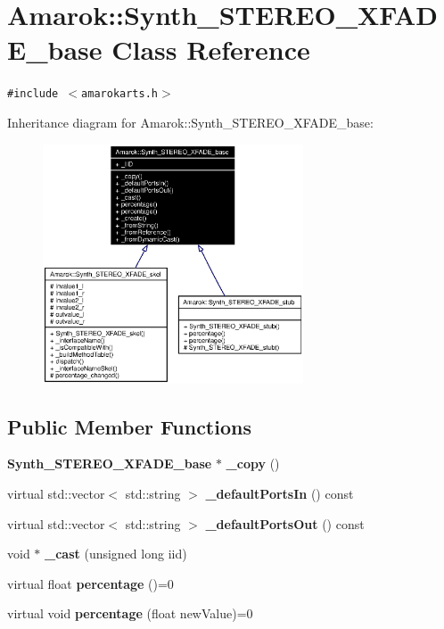 \section{Amarok::Synth\_\-STEREO\_\-XFADE\_\-base Class Reference}
\label{classAmarok_1_1Synth__STEREO__XFADE__base}
{\tt \#include $<$amarokarts.h$>$}

Inheritance diagram for Amarok::Synth\_\-STEREO\_\-XFADE\_\-base:\begin{figure}[H]
\begin{center}
\leavevmode
\includegraphics[width=219pt]{classAmarok_1_1Synth__STEREO__XFADE__base__inherit__graph}
\end{center}
\end{figure}
\subsection*{Public Member Functions}
\begin{CompactItemize}
\item 
{\bf Synth\_\-STEREO\_\-XFADE\_\-base} $\ast$ {\bf \_\-copy} ()
\item 
virtual std::vector$<$ std::string $>$ {\bf \_\-default\-Ports\-In} () const 
\item 
virtual std::vector$<$ std::string $>$ {\bf \_\-default\-Ports\-Out} () const 
\item 
void $\ast$ {\bf \_\-cast} (unsigned long iid)
\item 
virtual float {\bf percentage} ()=0
\item 
virtual void {\bf percentage} (float new\-Value)=0
\end{CompactItemize}
